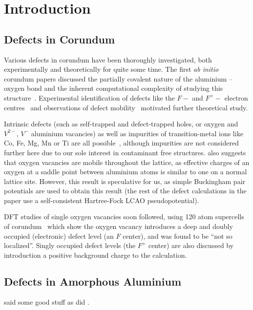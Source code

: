 \chapter{Introduction}

\section{Defects in Corundum}
Various defects in corundum have been thoroughly investigated, both experimentally and theoretically for quite some time. The first \emph{ab initio} corundum papers discussed the partially covalent nature of the aluminium -- oxygen bond and the inherent computational complexity of studying this structure~\cite{Causa1987}. Experimental identification of defects like the $F-$ and $F^+-$ electron centres~\cite{Kotomin1989} and observations of defect mobility~\cite{Kulis1991} motivated further theoretical study.

Intrinsic defects (such as self-trapped and defect-trapped holes, or oxygen and $V^{2-}$, $V^-$ aluminium vacancies) as well as impurities of transition-metal ions like Co, Fe, Mg, Mn or Ti are all possible~\cite{Jacobs1994}, although impurities are not considered further here due to our sole interest in contaminant free structures. \citeauthor{Jacobs1994} also suggests that oxygen vacancies are mobile throughout the lattice, as effective charges of an oxygen at a saddle point between aluminium atoms is similar to one on a normal lattice site. However, this result is speculative for us, as simple Buckingham pair potentials are used to obtain this result (the rest of the defect calculations in the paper use a self-consistent Hartree-Fock LCAO pseudopotential).

DFT studies of single oxygen vacancies soon followed, using 120 atom supercells of corundum~\cite{Xu1997} which show the oxygen vacancy introduces a deep and doubly occupied (electronic) defect level (an $F$ center), and was found to be ``not so localized''.
Singly occupied defect levels (the $F^+$ center) are also discussed by introduction a positive background charge to the calculation. 

\cite{Xu1997,Heuer1999,Matsunaga2003,Carrasco2004,Perevalov2010,Pustovarov2011,Elliot2013}

\section{Defects in Amorphous Aluminium}

\citeauthor{Momida2011} said some good stuff \cite{Momida2011,Mathews2004} as did \citeauthor{Blochl1994}.  